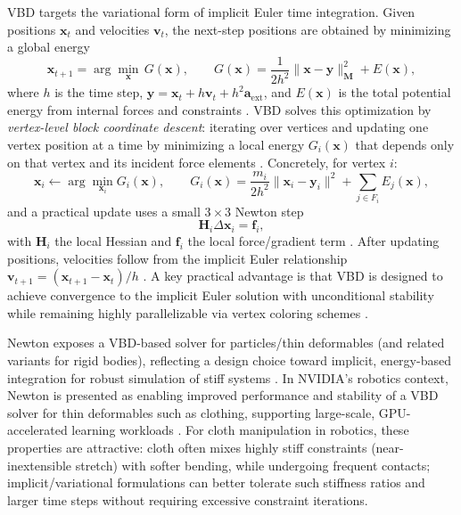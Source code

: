 \ac{VBD} targets the variational form of implicit Euler time integration.
Given positions $\mathbf{x}_t$ and velocities $\mathbf{v}_t$, the next-step positions are
obtained by minimizing a global energy
\begin{equation}
\mathbf{x}_{t+1} = \arg\min_{\mathbf{x}}\, G(\mathbf{x}), \qquad
G(\mathbf{x}) = \frac{1}{2h^2}\|\mathbf{x}-\mathbf{y}\|_{\mathbf{M}}^2 + E(\mathbf{x}),
\label{eq:vbd_global_energy}
\end{equation}
where $h$ is the time step, $\mathbf{y}=\mathbf{x}_t+h\mathbf{v}_t+h^2\mathbf{a}_\mathrm{ext}$,
and $E(\mathbf{x})$ is the total potential energy from internal forces and constraints
\cite{chen2024vbd}. \ac{VBD} solves this optimization by \emph{vertex-level block coordinate
descent}: iterating over vertices and updating one vertex position at a time by minimizing a
local energy $G_i(\mathbf{x})$ that depends only on that vertex and its incident force elements
\cite{chen2024vbd}. Concretely, for vertex $i$:
\begin{equation}
\mathbf{x}_i \leftarrow \arg\min_{\mathbf{x}_i} G_i(\mathbf{x}), \qquad
G_i(\mathbf{x})=\frac{m_i}{2h^2}\|\mathbf{x}_i-\mathbf{y}_i\|^2+\sum_{j\in F_i}E_j(\mathbf{x}),
\label{eq:vbd_local_energy}
\end{equation}
and a practical update uses a small $3\times 3$ Newton step
\begin{equation}
\mathbf{H}_i \Delta \mathbf{x}_i = \mathbf{f}_i,
\label{eq:vbd_newton}
\end{equation}
with $\mathbf{H}_i$ the local Hessian and $\mathbf{f}_i$ the local force/gradient term
\cite{chen2024vbd}. After updating positions, velocities follow from the implicit Euler
relationship $\mathbf{v}_{t+1}=(\mathbf{x}_{t+1}-\mathbf{x}_t)/h$ \cite{chen2024vbd}.
A key practical advantage is that \ac{VBD} is designed to achieve convergence to the implicit
Euler solution with unconditional stability while remaining highly parallelizable via vertex
coloring schemes \cite{chen2024vbd}.


Newton exposes a \ac{VBD}-based solver for particles/thin deformables (and related variants for
rigid bodies), reflecting a design choice toward implicit, energy-based integration for robust
simulation of stiff systems \cite{newton_solvers_doc}. In NVIDIA's robotics context, Newton
is presented as enabling improved performance and stability of a \ac{VBD} solver for thin
deformables such as clothing, supporting large-scale, \ac{GPU}-accelerated learning workloads
\cite{isaaclab_newton_blog_2025}.
For cloth manipulation in robotics, these properties are attractive: cloth often mixes highly
stiff constraints (near-inextensible stretch) with softer bending, while undergoing frequent
contacts; implicit/variational formulations can better tolerate such stiffness ratios and larger
time steps without requiring excessive constraint iterations.

